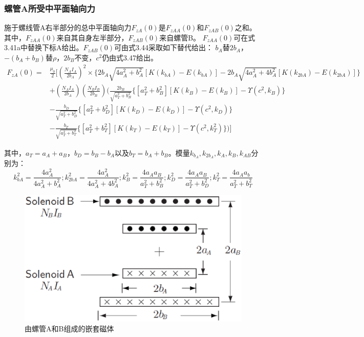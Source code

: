 \subsubsection{螺管A所受中平面轴向力}
施于螺线管A右半部分的总中平面轴向力$F_{zA}(0)$是$F_{zAA}(0)$和$F_{zAB}(0)$之和。
其中，$F_{zAA}(0)$来自其自身左半部分，$F_{zAB}(0)$来自螺管B。
$F_{zAA}(0)$可在式3.41a中替换下标A给出。$F_{zAB}(0)$可由式3.44采取如下替代给出：
$b_A$替$2b_A$，$−(b_A+b_B)$替$\rho$，$2b_B$不变，$c^2$仍由式3.47给出。
\begin{equation}
\begin{split}
F_{zA}(0)=&\frac{\mu_0}{2}\bigg[\left(\frac{N_A I_A}{2b_A}\right)^2\times \{2b_A\sqrt{4a_A^2+b_A^2}[K(k_{bA})-E(k_{bA})]-2b_A\sqrt{4a_A^2+4b_A^2}[K(k_{2bA})-E(k_{2bA})]\}\\
&+\left(\frac{N_AI_A}{2b_A}\right)\left(\frac{N_BI_B}{2b_B}\right)\big(\frac{2b_B}{\sqrt{a_T^2+b_B^2}}\{[a_T^2+b_B^2][K(k_B)-E(k_{B})]-\Upsilon(c^2,k_B)\}\\
&-\frac{b_D}{\sqrt{a_T^2+b_D^2}}\{{[a_T^2+b_D^2][K(k_D)-E(k_D)]-\Upsilon(c^2,k_D)}\}\\
&-\frac{b_T}{\sqrt{a_T^2+b_T^2}}\{[a_T^2+b_T^2][K(k_T)-E(k_T)]-\Upsilon(c^2,k_T^2)\}\big)\bigg]
\end{split}
\end{equation}

其中，$a_T=a_A+a_B$，$b_D=b_B-b_A$以及$b_T=b_A+b_B$。模量$k_{b_A}, k_{2b_A}, k_A,k_B, k_{AB}$分别为：
$$ k_{bA}^2=\frac{4a_A^2}{4a_A^2+b_A^2}; k_{2bA}^2=\frac{4a_A^2}{4a_A^2+4b_A^2}; k_B^2=\frac{4a_Aa_B}{a_T^2+b_B^2};k_D^2=\frac{4a_Aa_B}{a_T^2+b_D^2}; k_T^2=\frac{4a_Aa_b}{a_T^2+b_T^2}$$

\begin{figure}[htbp]
  \centering
 \includegraphics[scale=0.4]{chpt3/figs/fig3.9.eps}
  \caption{由螺管A和B组成的嵌套磁体}
\end{figure}

